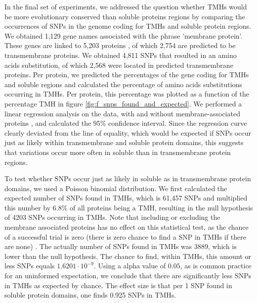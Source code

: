 In the final set of experiments, we addressed the question whether TMHs would be more evolutionary conserved than soluble proteins regions by comparing the occurrences of SNPs in the genome coding for TMHs and soluble protein regions. 
We obtained 1,129 gene names associated with the phrase 'membrane protein'.
These genes are linked to 5,203 proteins
, of which 2,754
are predicted to be transmembrane proteins.
We obtained 4,811 SNPs that resulted in an
amino acids substitution, of which 2,568 were located 
in predicted transmembrane proteins.
Per protein, we predicted the percentages of the gene coding for TMHs and soluble regions
and calculated the percentage of amino acids substitutions
occurring in TMHs.
Per protein, this percentage was plotted as a function of the percentage TMH in figure
\ref{fig:f_snps_found_and_expected}.
We performed a linear regression analysis on the data, with and without
membrane-associated proteins , and calculated the 95\%
confidence interval.
Since the regression curve clearly deviated from the line of equality,
which would be expected if SNPs occur just as likely within transmembrane and soluble protein domains,
this suggests that variations occur more often in soluble 
than in transmembrane protein regions.

To test whether SNPs occur just as likely in soluble as
in transmembrane protein domains, we used a Poisson binomial
distribution. We first calculated the expected number of SNPs
found in TMHs, which is 61,457 SNPs  and multiplied this number by 6.8\% 
of all proteins being a TMH, resulting in the null hypothesis
of 4203 SNPs occurring in TMHs. 
Note that including or excluding
the membrane associated proteins 
has no effect on this statistical test, as the chance 
of a successful trial is zero (there is zero chance
to find a SNP in TMHs if there are none) .
The actually number of SNPs found in TMHs
was 3889, which is lower than the null hypothesis. 
The chance to find, within TMHs, this amount or less SNPs 
equals $1.6201 \cdot 10^{-9}$.
Using a alpha value of $0.05$, as is common practice for an uninformed
expectation, we conclude that there are significantly less SNPs
in TMHs as expected by chance.
The effect size is that per 1 SNP found in soluble protein
domains, one finds 0.925 SNPs in TMHs.

